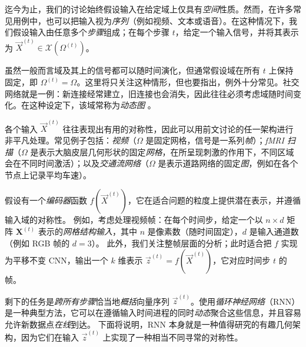 迄今为止，我们的讨论始终假设输入在给定域上仅具有\emph{空间}性质。然而，在许多常见用例中，也可以把输入视为\emph{序列}（例如视频、文本或语音）。在这种情况下，我们假设输入由任意多个\emph{步骤}组成；在每个步骤 $t$，给定一个输入信号，并将其表示为 $\vec{X}^{(t)} \in \mathcal{X}(\Omega^{(t)})$。

虽然一般而言域及其上的信号都可以随时间演化，但通常假设域在所有 $t$ 上保持固定，即 $\Omega^{(t)} = \Omega$。这里将只关注这种情形，但也要指出，例外十分常见。社交网络就是一例：新连接经常建立，旧连接也会消失，因此往往必须考虑域随时间变化。在这种设定下，该域常称为\emph{动态图} \citep{xu2020inductive,rossi2020temporal}。

各个输入 $\vec{X}^{(t)}$ 往往表现出有用的对称性，因此可以用前文讨论的任一架构进行非平凡处理。常见例子包括：\emph{视频}（$\Omega$ 是固定网格，信号是一系列\emph{帧}）；\emph{fMRI 扫描}（$\Omega$ 是表示大脑皮层几何形状的固定\emph{网格}，在所呈现刺激的作用下，不同区域会在不同时间激活）；以及\emph{交通流网络}（$\Omega$ 是表示道路网络的固定\emph{图}，例如在各个节点上记录平均车速）。



假设有一个\emph{编码器}函数 $f(\vec{X}^{(t)})$，它在适合问题的粒度上提供潜在表示，并遵循输入域的对称性。
%
例如，考虑处理视频帧：在每个时间步，给定一个以 $n\times d$ 矩阵 $\mathbf{X}^{(t)}$ 表示的\emph{网格结构输入}，其中 $n$ 是像素数（随时间固定），$d$ 是输入通道数（例如 RGB 帧的 $d=3$）。%
此外，我们关注整帧层面的分析；此时适合把 $f$ 实现为平移不变 CNN，输出一个 $k$ 维表示 $\vec{z}^{(t)} = f(\vec{X}^{(t)})$，它对应时间步 $t$ 的帧。%

剩下的任务是\emph{跨所有步骤}恰当地\emph{概括}向量序列 $\vec{z}^{(t)}$。使用\emph{循环神经网络}（RNN）是一种典型方法，它可以在遵循输入时间进程的同时\emph{动态}聚合这些信息，并且容易允许新数据点\emph{在线}到达。
%
%
下面将说明，RNN 本身就是一种值得研究的有趣几何架构，因为它们在输入 $\vec{z}^{(t)}$ 上实现了一种相当不同寻常的对称性。

